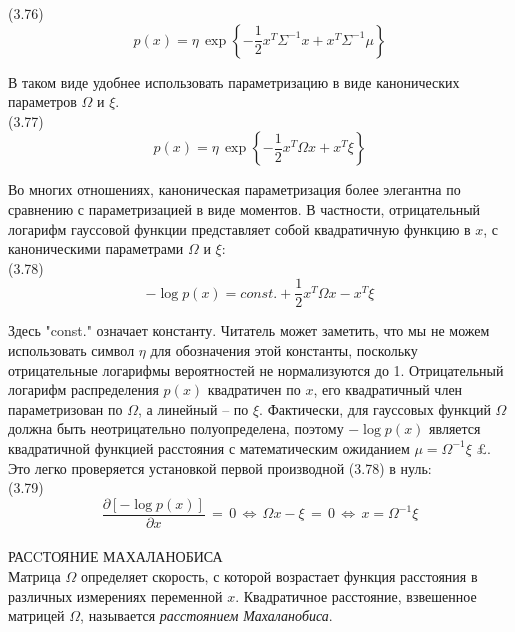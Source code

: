 \documentclass[10pt,a4paper]{article}
\begin{document}
(3.76)
$$p(x)=\eta\,\exp\left\lbrace -\frac{1}{2}x^T\varSigma^{-1}x+x^T\varSigma^{-1}\mu\right\rbrace $$

В таком виде удобнее использовать параметризацию в виде канонических параметров $\varOmega$ и $\xi$.\\

(3.77)
$$p(x)=\eta\,\exp\left\lbrace -\frac{1}{2}x^T\varOmega x+x^T\xi\right\rbrace $$

Во многих отношениях, каноническая параметризация более элегантна по сравнению с параметризацией в виде моментов. В частности, отрицательный логарифм гауссовой функции представляет собой квадратичную функцию в $x$, с каноническими параметрами $\varOmega$ и $\xi$:\\

(3.78)
$$-\log p(x)=\textit{const.}+\frac{1}{2}x^T\varOmega x-x^T\xi$$

Здесь "const." означает константу. Читатель может заметить, что мы не можем использовать символ $\eta$ для обозначения этой константы, поскольку отрицательные логарифмы вероятностей не нормализуются до 1. Отрицательный логарифм распределения $p(x)$ квадратичен по $x$, его квадратичный член параметризован по $\varOmega$, а линейный – по $\xi$. Фактически, для гауссовых функций $\varOmega$ должна быть неотрицательно полуопределена, поэтому $-\log p(x)$ является квадратичной функцией расстояния с математическим ожиданием $\mu=\varOmega^{-1}\xi$ £. Это легко проверяется установкой первой производной (3.78) в нуль:\\

(3.79)
$$\frac{\partial[-\log p(x)]}{\partial x}\,=\,0\,\Leftrightarrow\,\varOmega x-\xi\,=\,0\,\Leftrightarrow\,x=\varOmega^{-1}\xi$$\\

РАСCТОЯНИЕ МАХАЛАНОБИСА\\
Матрица $\varOmega$ определяет скорость, с которой возрастает функция расстояния в различных измерениях переменной $x$. Квадратичное расстояние, взвешенное матрицей $\varOmega$, называется \textit{расстоянием Махаланобиса}.\\
\end{document}
